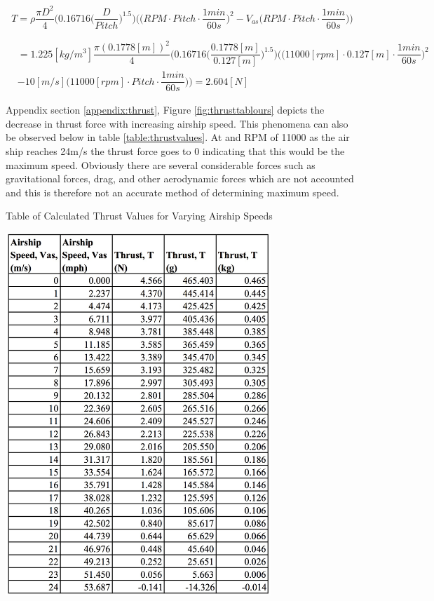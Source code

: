 \documentclass[../main.tex]{subfiles}
\begin{document}
\begin{equation}
\label{eqn:thrustfinal}
T = \rho \dfrac{\pi D^2}{4}\Bigg(0.16716\Big(\dfrac{D}{Pitch}\Big)^{1.5}\Bigg)\Bigg(\Big(RPM\cdot Pitch \cdot \dfrac{1min}{60s}\Big)^2 - V_{as}\Big(RPM\cdot Pitch \cdot \dfrac{1min}{60s}\Big)\Bigg)
\end{equation}

\begin{align*}
&= 1.225[kg/m^3] \dfrac{\pi (0.1778[m])^2}{4}\Bigg(0.16716\Big(\dfrac{0.1778[m]}{0.127[m]}\Big)^{1.5}\Bigg)\Bigg(\Big(11000[rpm]\cdot 0.127[m] \cdot \dfrac{1min}{60s}\Big)^2 \\ 
&- 10[m/s]\Big(11000[rpm]\cdot Pitch \cdot \dfrac{1min}{60s}\Big)\Bigg) = 2.604[N]
\end{align*}

Appendix section \ref{appendix:thrust}, Figure \ref{fig:thrusttablours} depicts the decrease in thrust force with increasing airship speed. This phenomena can also be observed below in table \ref{table:thrustvalues}. At and RPM of 11000 as the air ship reaches 24m/s the thrust force goes to 0 indicating that this would be the maximum speed. Obviously there are several considerable forces such as gravitational forces, drag, and other aerodynamic forces which are not accounted and this is therefore not an accurate method of determining maximum speed.
\begin{table}[H]
	\centering
    \caption{Table of Calculated Thrust Values for Varying Airship Speeds}
	\includegraphics[width=0.75\textwidth]{img/thrust/thrust_table.jpg}
	\label{table:thrustvalues}
\end{table}
\end{document}
